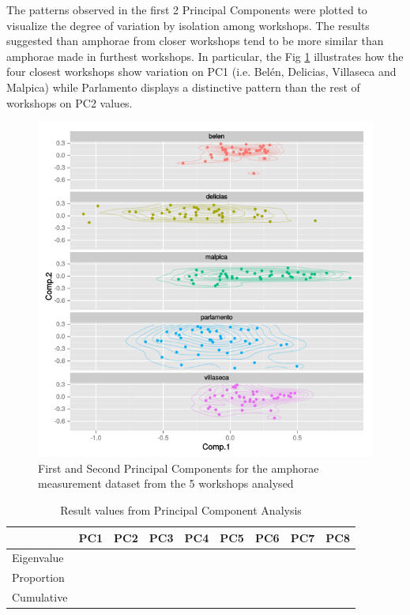 \documentclass[review]{elsarticle}
\begin{document}
The patterns observed in the first 2 Principal Components were plotted to visualize the degree of variation by isolation among workshops. The results suggested than amphorae from closer workshops tend to be more similar than amphorae made in furthest workshops. In particular, the Fig \ref{pca} illustrates how the four closest workshops show variation on PC1 (i.e. Bel\'en, Delicias, Villaseca and Malpica) while Parlamento displays a distinctive pattern than the rest of workshops on PC2 values. 

\begin{figure}[htp]
	\centering
\includegraphics[scale=0.47]{pca.png}
\caption{First and Second Principal Components for the amphorae measurement dataset from the 5 workshops analysed}
\label{pca}
\end{figure} 


\begin{table}[htp]
\begin{tabular}{lcccccccc}
\hline
      		&  PC1 & PC2	& PC3 & PC4 & PC5 & PC6 & PC7 & PC8     \\ \hline
Eigenvalue  	& 	   &		&	  &  	&	  &	    &     &           \\
Proportion  & 	   &		&	  &   	&	  &	    &     &           \\
Cumulative  &       &    &     &     &     &     &     &           \\

\end{tabular}
\caption{Result values from Principal Component Analysis}
\label{table:spatgeo}
\end{table}
\end{document}
